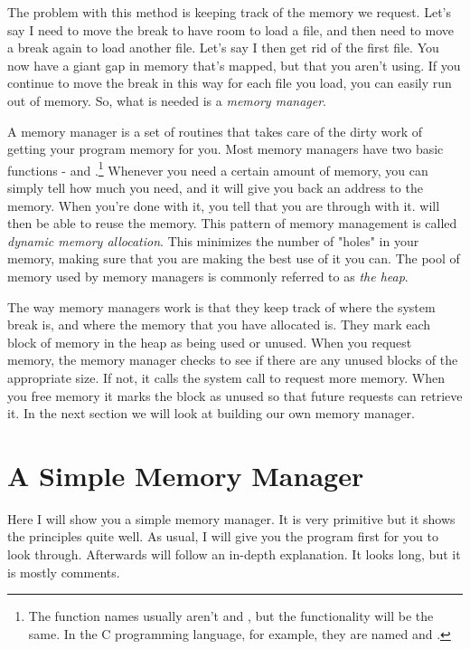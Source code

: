  

The problem with this method is keeping track of the memory we request.  Let's say I need to
move the break to have room to load a file, and then need to move a break again to
load another file.  Let's say I then get rid of the first file.  You now have
a giant gap in memory that's mapped, but that you aren't using.  If you continue to 
move the break in this way for each file you load, you can easily run out of memory.  
So, what is needed is a \emph{memory manager}.  

A memory manager is a set of routines that takes care of the dirty work of getting
your program memory for you.  Most memory managers have two basic functions - 
 and .\footnote{The function 
names usually aren't  and , but
the functionality will be the same.  In the C programming language, for example, they
are named  and .}
Whenever you need a certain amount of memory, you can simply tell 
how much you need, and it will give you back an address to the memory.  
When you're done with it, you tell 
that you are through with it.   will then be able to reuse the
memory.  This pattern of memory management is called \emph{dynamic memory allocation}.  
This minimizes the number of "holes" in your memory, making sure that you
are making the best use of it you can.
The pool of memory used by memory managers
is commonly referred to as 
\emph{the heap}.

The way memory managers work is that they keep track of where the system break is, and
where the memory that you have allocated is.  
They mark each block of memory in the heap as
being used or unused.  When you request memory, the memory manager checks to see if there
are any unused blocks of the appropriate size.  If not, it calls the 
system call to request more memory.  When you free memory it marks the block as unused
so that future requests can retrieve it.  In the next section we will look at building
our own memory manager.

\section{A Simple Memory Manager}

Here I will show you a simple memory manager.  It is very primitive but it shows the 
principles quite well.
As usual, I will give you the program first for you to look through.  Afterwards will follow
an in-depth explanation.  It looks long, but it is mostly comments.

